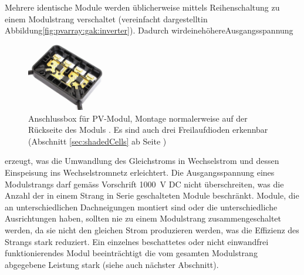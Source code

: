 Mehrere  identische  Module  werden  \"ublicherweise  mittels  Reihenschaltung
zu  einem  Modulstrang  verschaltet  (vereinfacht  dargestellt\hfill  in\hfill
Abbildung\hfill    \ref{fig:pvarray:gak:inverter}).    \hfill    Dadurch\hfill
wird\hfill eine\hfill h\"ohere\hfill Ausgangsspannung

\begin{figure}
    \centering
    \includegraphics[width=0.3\textwidth]{images/solar-facility/pvJunctionBox.jpeg}
    \caption[Anschlussbox PV-Modul]{
        Anschlussbox   f\"ur   PV-Modul,   Montage   normalerweise   auf   der
        R\"uckseite  des  Moduls  \cite{ref:junctionBox}. Es  sind  auch  drei
        Freilaufdioden  erkennbar  (Abschnitt \ref{sec:shadedCells}  ab  Seite
        \pageref{sec:shadedCells})%
    }
    \label{fig:pvJunctionBox}
\end{figure}

\noindent erzeugt,  was die  Umwandlung des  Gleichstroms in  Wechselstrom und
dessen  Einspeisung  ins  Wechselstromnetz  erleichtert. Die  Ausgangsspannung
eines  Modulstrangs   darf  gem\"ass  Vorschrift  \SI{1000}{\volt}   DC  nicht
\"uberschreiten,  was die  Anzahl der  in einem  Strang in  Serie geschalteten
Module beschr\"ankt.  Module, die  an unterschiedlichen Dachneigungen montiert
sind  oder die  unterschiedliche  Ausrichtungen haben,  sollten  nie zu  einem
Modulstrang  zusammengeschaltet  werden,  da  sie  nicht  den  gleichen  Strom
produzieren  werden,  was  die  Effizienz  des  Strangs  stark  reduziert. Ein
einzelnes   beschattetes  oder   nicht   einwandfrei  funktionierendes   Modul
beeintr\"achtigt die vom gesamten Modulstrang abgegebene Leistung stark (siehe
auch n\"achster Abschnitt).

